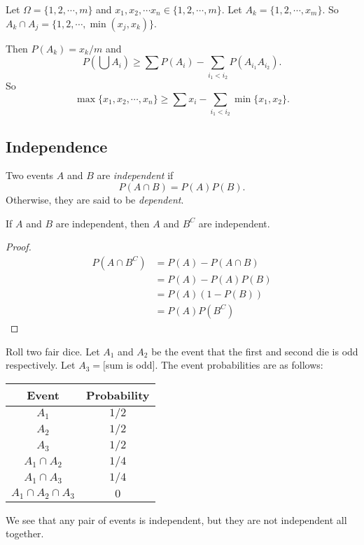\documentclass[a4paper]{article}
\begin{document}
\begin{eg}
  Let $\Omega = \{1, 2, \cdots, m\}$ and $x_1, x_2, \cdots x_n\in \{1, 2, \cdots, m\}$. Let $A_k = \{1, 2, \cdots, x_m\}$. So $A_k\cap A_j = \{1, 2, \cdots, \min(x_j, x_k)\}$.

  Then $P(A_k) = x_k/m$ and 
  \[
    P\left(\bigcup A_i\right) \geq \sum P(A_i) - \sum_{i_1 < i_2} P(A_{i_1}A_{i_2}).
  \]
  So 
  \[
    \max\{x_1, x_2, \cdots, x_n\} \geq \sum x_i - \sum_{i_1 < i_2} \min\{x_1, x_2\}.
  \]
\end{eg}

\subsection{Independence}
\begin{defi}
  Two events $A$ and $B$ are \emph{independent} if
  \[
    P(A\cap B) = P(A)P(B).
  \]
  Otherwise, they are said to be \emph{dependent}.
\end{defi}

\begin{prop}
  If $A$ and $B$ are independent, then $A$ and $B^C$ are independent.
\end{prop}

\begin{proof}
  \begin{align*}
    P(A\cap B^C) &= P(A) - P(A\cap B)\\
    &= P(A) - P(A)P(B)\\
    &= P(A)(1 - P(B))\\
    &= P(A)P(B^C)
  \end{align*}
\end{proof}

\begin{eg}
  Roll two fair dice. Let $A_1$ and $A_2$ be the event that the first and second die is odd respectively. Let $A_3 = [$sum is odd$]$. The event probabilities are as follows:

  \noindent\begin{tabular}{cc}
    \toprule
    Event & Probability\\
    \midrule
    $A_1$ & $1/2$\\
    $A_2$ & $1/2$\\
    $A_3$ & $1/2$\\
    $A_1\cap A_2$ & $1/4$\\
    $A_1\cap A_3$ & $1/4$\\
    $A_1\cap A_2\cap A_3$ & $0$\\
    \bottomrule
  \end{tabular}

  We see that any pair of events is independent, but they are not independent all together.
\end{eg}
\end{document}
